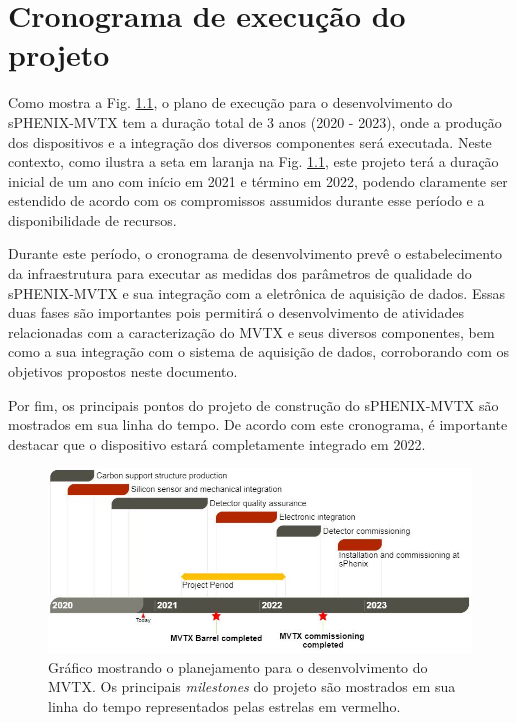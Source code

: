 \chapter{Cronograma de execução do projeto}

Como mostra a Fig. \ref{cronograma}, o plano de execução para o desenvolvimento do sPHENIX-MVTX tem a duração total de 3 anos (2020 - 2023), onde a produção dos dispositivos e a integração dos diversos componentes será executada. Neste contexto, como ilustra a seta em laranja na Fig. \ref{cronograma}, este projeto terá a duração inicial de um ano com início em 2021 e término em 2022, podendo claramente ser estendido de acordo com os compromissos assumidos durante esse período e a disponibilidade de recursos.

Durante este período, o cronograma de desenvolvimento prevê o estabelecimento da infraestrutura para executar as medidas dos parâmetros de qualidade do sPHENIX-MVTX e sua integração com a eletrônica de aquisição de dados. Essas duas fases são importantes pois permitirá o desenvolvimento de atividades relacionadas com a caracterização do MVTX e seus diversos componentes, bem como a sua integração com o sistema de aquisição de dados, corroborando com os objetivos propostos neste documento. 

Por fim, os principais pontos do projeto de construção do sPHENIX-MVTX são mostrados em sua linha do tempo. De acordo com este cronograma, é importante destacar que o dispositivo estará completamente integrado em 2022.

\begin{figure}
    \centering
    \includegraphics[width=16.0cm]{assets/cronograma.JPG}
    \caption{Gráfico mostrando o planejamento para o desenvolvimento do MVTX. Os principais {\it milestones} do projeto são mostrados em sua linha do tempo representados pelas estrelas em vermelho.}
    \label{cronograma}
\end{figure}
